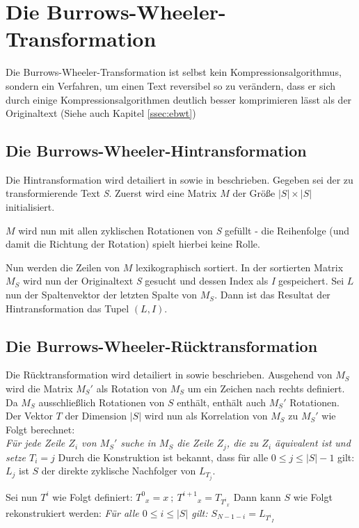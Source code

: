 \documentclass[ngerman,pdftex,paper=A4,DIV=calc,titlepage,12pt]{scrartcl}
\newtheorem[L]{boxedDefinition}{Definition}
\begin{document}
\section{Die Burrows-Wheeler-Transformation}
Die Burrows-Wheeler-Transformation ist selbst kein Kompressionsalgorithmus, sondern ein Verfahren, um einen Text reversibel so zu verändern, dass er sich durch einige Kompressionsalgorithmen deutlich besser komprimieren lässt als der Originaltext (Siehe auch Kapitel \vref{ssec:ebwt})
\subsection{Die Burrows-Wheeler-Hintransformation}\label{ssec:transformation}
Die Hintransformation wird detailiert in \cite[Abschnitt 6.5]{Heun2003} sowie in \cite[Seite 2 - Algorithmus C]{burrows1994block} beschrieben.
Gegeben sei der zu transformierende Text \textit{S}. Zuerst wird eine Matrix $M$ der Größe $|S| \times |S|$ initialisiert.

$M$ wird nun mit allen zyklischen Rotationen von \textit{S} gefüllt - die Reihenfolge (und damit die Richtung der Rotation) spielt hierbei keine Rolle.

Nun werden die Zeilen von $M$ lexikographisch sortiert. In der sortierten Matrix $M_S$ wird nun der Originaltext \textit{S} gesucht und dessen Index als \textit{I} gespeichert. Sei $L$ nun der Spaltenvektor der letzten Spalte von $M_S$. Dann ist das Resultat der Hintransformation das Tupel $(L, I)$.
\subsection{Die Burrows-Wheeler-Rücktransformation}
\label{ssec:backtransformation}
Die Rücktransformation wird detailiert in \cite[Seite 3-5, Algorithmus D]{burrows1994block} sowie \cite[Abschnitt 6.5]{Heun2003} beschrieben.
Ausgehend von $M_S$ wird die Matrix $M_S'$ als Rotation von $M_S$ um ein Zeichen nach rechts definiert. Da $M_S$ ausschließlich Rotationen von $S$ enthält, enthält auch $M_S'$ Rotationen. Der Vektor $T$ der Dimension $|S|$ wird nun als Korrelation von $M_S$ zu $M_S'$ wie Folgt berechnet:\\
\textit{Für jede Zeile $Z_i$ von $M_S'$ suche in $M_S$ die Zeile $Z_j$, die zu $Z_i$ äquivalent ist und setze $T_i = j$}
Durch die Konstruktion ist bekannt, dass für alle $0 \leq j \leq |S|-1$ gilt: $L_j$ ist $S$ der direkte zyklische Nachfolger von $L_{T_j}$.

Sei nun $T^i$ wie Folgt definiert: ${T^0}_x = x\ ;\ {T^{i+1}}_x = T_{{T^i}_x}$
Dann kann $S$ wie Folgt rekonstrukiert werden: \textit{Für alle $0 \leq i \leq |S|$ gilt: $S_{N-1-i} = L_{{T^i}_I}$}
\end{document}
